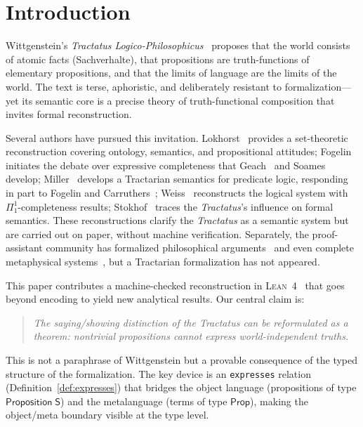 \documentclass[10pt, letterpaper]{article}
\theoremstyle{definition}
\theoremstyle{remark}
\newcommand{\Sach}{\mathsf{S}}
\newcommand{\Prop}{\mathsf{Prop}}
\newcommand{\Lean}{\textsc{Lean}}
\begin{document}
\section{Introduction}
\label{sec:intro}

Wittgenstein's \emph{Tractatus Logico-Philosophicus}~\cite{wittgenstein1921}
proposes that the world consists of atomic facts (Sachverhalte),
that propositions are truth-functions of elementary propositions,
and that the limits of language are the limits of the world.
The text is terse, aphoristic, and deliberately resistant to
formalization---yet its semantic core is a precise theory of
truth-functional composition that invites formal reconstruction.

Several authors have pursued this invitation.
Lokhorst~\cite{lokhorst1988} provides a set-theoretic
reconstruction covering ontology, semantics, and propositional
attitudes;
Fogelin~\cite{fogelin1987} initiates the debate over expressive
completeness that Geach~\cite{geach1981} and
Soames~\cite{soames1983} develop;
Miller~\cite{miller1995} develops a Tractarian semantics for
predicate logic, responding in part to Fogelin and
Carruthers~\cite{carruthers1989};
Weiss~\cite{weiss2017} reconstructs the logical system with
$\Pi^1_1$-completeness results;
Stokhof~\cite{stokhof2008} traces the \emph{Tractatus}'s
influence on formal semantics.
These reconstructions clarify the \emph{Tractatus} as a semantic
system but are carried out on paper, without machine verification.
Separately, the proof-assistant community has formalized
philosophical arguments~\cite{benzmuller2017,fitelson2007} and
even complete metaphysical systems~\cite{scherf2025}, but a
Tractarian formalization has not appeared.

This paper contributes a machine-checked reconstruction in
\Lean~4~\cite{moura2021} that goes beyond encoding to yield new
analytical results.  Our central claim is:

\begin{quote}
\emph{The saying/showing distinction of the \emph{Tractatus} can
be reformulated as a theorem: nontrivial propositions cannot
express world-independent truths.}
\end{quote}

\noindent
This is not a paraphrase of Wittgenstein but a provable
consequence of the typed structure of the formalization.
The key device is an \texttt{expresses} relation (Definition~\ref{def:expresses})
that bridges the object language (propositions of type
$\mathsf{Proposition}\;\Sach$) and the metalanguage (terms of
type $\Prop$), making the object/meta boundary visible at the
type level.
\end{document}
